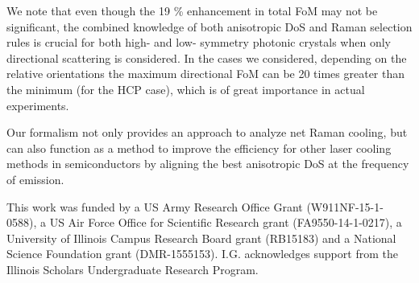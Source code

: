 \documentclass[%
 reprint,
superscriptaddress,
 amsmath,amssymb,
 aps,
pra,
]{revtex4-1}
\begin{document}
We note that even though the 19 \% enhancement in total FoM may not be significant, the combined knowledge of both anisotropic DoS and Raman selection rules is crucial for both high- and low- symmetry photonic crystals when only directional scattering is considered. In the cases we considered, depending on the relative orientations the maximum directional FoM can be 20 times greater than the minimum (for the HCP case), which is of great importance in actual experiments.



Our formalism not only provides an approach to analyze net Raman cooling, but can also function as a method to improve the efficiency for other laser cooling methods in semiconductors \cite{zhang2013laser,zhang2016resolved} by aligning the best anisotropic DoS at the frequency of emission.
%


\begin{acknowledgments}
This work was funded by a US Army Research Office Grant (W911NF-15-1-0588), a US Air Force Office for Scientific Research grant (FA9550-14-1-0217), a University of Illinois Campus Research Board grant (RB15183) and a National Science Foundation grant (DMR-1555153). I.G. acknowledges support from the Illinois Scholars Undergraduate Research Program.
\end{acknowledgments}




\end{document}
